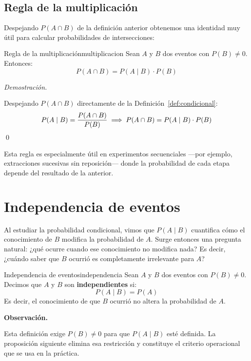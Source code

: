 \documentclass[12pt, a4paper]{book}
\newenvironment{observacion}{%
    \par\medskip\noindent\textbf{\color{azul}Observaci\'{o}n.}\enspace\itshape
}{\par\medskip}
\renewenvironment{proof}{%
    \par\medskip\noindent\textit{Demostraci\'{o}n.}\enspace
}{\qed\par\medskip}
\numberwithin{equation}{chapter}
\begin{document}
\subsection{Regla de la multiplicaci\'{o}n}

Despejando $P(A \cap B)$ de la definición anterior obtenemos una 
identidad muy útil para calcular probabilidades de intersecciones:

\begin{proposicion}{Regla de la multiplicación}{multiplicacion}
	Sean $A$ y $B$ dos eventos con $P(B) \neq 0$. Entonces:
	\[
	P(A \cap B) = P(A \mid B) \cdot P(B)
	\]
\end{proposicion}

\begin{proof}
	Despejando $P(A \cap B)$ directamente de la 
	Definición~\ref{def:condicional}:
	\[
	P(A \mid B) = \frac{P(A \cap B)}{P(B)} \implies 
	P(A \cap B) = P(A \mid B) \cdot P(B) \qedhere
	\]
\end{proof}

Esta regla es especialmente útil en experimentos secuenciales ---por 
ejemplo, extracciones sucesivas sin reposición--- donde la probabilidad 
de cada etapa depende del resultado de la anterior.

\section{Independencia de eventos}

Al estudiar la probabilidad condicional, vimos que $P(A \mid B)$ 
cuantifica cómo el conocimiento de $B$ modifica la probabilidad de $A$. 
Surge entonces una pregunta natural: ¿qué ocurre cuando ese conocimiento 
no modifica nada? Es decir, ¿cuándo saber que $B$ ocurrió es 
completamente irrelevante para $A$?

\begin{definicion}{Independencia de eventos}{independencia}
	Sean $A$ y $B$ dos eventos con $P(B) \neq 0$. Decimos que $A$ y $B$ 
	son \textbf{independientes} si:
	\[
	P(A \mid B) = P(A)
	\]
	Es decir, el conocimiento de que $B$ ocurrió no altera la 
	probabilidad de $A$.
\end{definicion}

\begin{observacion}
	Esta definición exige $P(B) \neq 0$ para que $P(A \mid B)$ esté 
	definida. La proposición siguiente elimina esa restricción y 
	constituye el criterio operacional que se usa en la práctica.
\end{observacion}
\end{document}
